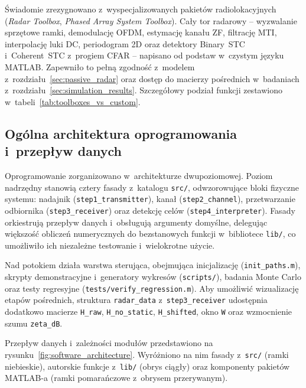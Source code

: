 Świadomie zrezygnowano z~wyspecjalizowanych pakietów radiolokacyjnych (\textit{Radar Toolbox}, \textit{Phased Array System Toolbox}). Cały tor radarowy -- wyzwalanie sprzętowe ramki, demodulację OFDM, estymację kanału ZF, filtrację MTI, interpolację luki DC, periodogram 2D oraz detektory Binary~STC i~Coherent~STC z~progiem CFAR -- napisano od podstaw w~czystym języku MATLAB. Zapewniło to pełną zgodność z~modelem z~rozdziału~\ref{sec:passive_radar} oraz dostęp do macierzy pośrednich w~badaniach z~rozdziału~\ref{sec:simulation_results}. Szczegółowy podział funkcji zestawiono w~tabeli~\ref{tab:toolboxes_vs_custom}.



\subsection{Ogólna architektura oprogramowania i~przepływ danych}
\label{subsec:software_architecture}

Oprogramowanie zorganizowano w~architekturze dwupoziomowej. Poziom nadrzędny stanowią cztery fasady z~katalogu \texttt{src/}, odwzorowujące bloki fizyczne systemu: nadajnik (\texttt{step1\_\allowbreak transmitter}), kanał (\texttt{step2\_\allowbreak channel}), przetwarzanie odbiornika (\texttt{step3\_\allowbreak receiver}) oraz detekcję celów (\texttt{step4\_\allowbreak interpreter}). Fasady orkiestrują przepływ danych i~obsługują argumenty domyślne, delegując większość obliczeń numerycznych do bezstanowych funkcji w~bibliotece \texttt{lib/}, co umożliwiło ich niezależne testowanie i~wielokrotne użycie.

Nad potokiem działa warstwa sterująca, obejmująca inicjalizację (\texttt{init\_paths.m}), skrypty demonstracyjne i~generatory wykresów (\texttt{scripts/}), badania Monte Carlo oraz testy regresyjne (\texttt{tests/\allowbreak verify\_\allowbreak regression.m}). Aby umożliwić wizualizację etapów pośrednich, struktura \texttt{radar\_data} z~\texttt{step3\_receiver} udostępnia dodatkowo macierze \texttt{H\_raw}, \texttt{H\_no\_static}, \texttt{H\_shifted}, okno \texttt{W} oraz wzmocnienie szumu \texttt{zeta\_dB}.

Przepływ danych i~zależności modułów przedstawiono na rysunku~\ref{fig:software_architecture}. Wyróżniono na nim fasady z~\texttt{src/} (ramki niebieskie), autorskie funkcje z~\texttt{lib/} (obrys ciągły) oraz komponenty pakietów MATLAB-a (ramki pomarańczowe z~obrysem przerywanym).



